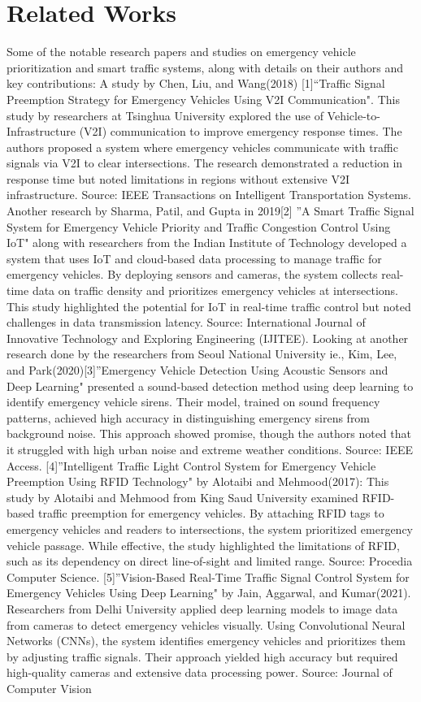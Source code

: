 \documentclass[conference]{IEEEtran}
\begin{document}
\section{Related Works}
Some of the notable research papers and studies on emergency vehicle prioritization and smart traffic systems, along with details on their authors and key contributions: 
A study by Chen, Liu, and Wang(2018) [1]“Traffic Signal Preemption Strategy for Emergency Vehicles Using V2I Communication". This study by researchers at Tsinghua University explored the use of Vehicle-to-Infrastructure (V2I) communication to improve emergency response times. The authors proposed a system where emergency vehicles communicate with traffic signals via V2I to clear intersections. The research demonstrated a reduction in response time but noted limitations in regions without extensive V2I infrastructure. Source: IEEE Transactions on Intelligent Transportation Systems. Another research by Sharma, Patil, and Gupta in 2019[2] ”A Smart Traffic Signal System for Emergency Vehicle Priority and Traffic Congestion Control Using IoT" along with researchers from the Indian Institute of Technology developed a system that uses IoT and cloud-based data processing to manage traffic for emergency vehicles. By deploying sensors and cameras, the system collects real-time data on traffic density and prioritizes emergency vehicles at intersections. This study highlighted the potential for IoT in real-time traffic control but noted challenges in data transmission latency. Source: International Journal of Innovative Technology and Exploring Engineering (IJITEE). Looking at another research done by the researchers from Seoul National University ie., Kim, Lee, and Park(2020)[3]”Emergency Vehicle Detection Using Acoustic Sensors and Deep Learning" presented a sound-based detection method using deep learning to identify emergency vehicle sirens. Their model, trained on sound frequency patterns, achieved high accuracy in distinguishing emergency sirens from background noise. This approach showed promise, though the authors noted that it struggled with high urban noise and extreme weather conditions. Source: IEEE Access. [4]”Intelligent Traffic Light Control System for Emergency Vehicle Preemption Using RFID Technology" by Alotaibi and Mehmood(2017): This study by Alotaibi and Mehmood from King Saud University examined RFID-based traffic preemption for emergency vehicles. By attaching RFID tags to emergency vehicles and readers to intersections, the system prioritized emergency vehicle passage. While effective, the study highlighted the limitations of RFID, such as its dependency on direct line-of-sight and limited range. Source: Procedia Computer Science. [5]”Vision-Based Real-Time Traffic Signal Control System for Emergency Vehicles Using Deep Learning" by Jain, Aggarwal, and Kumar(2021). Researchers from Delhi University applied deep learning models to image data from cameras to detect emergency vehicles visually. Using Convolutional Neural Networks (CNNs), the system identifies emergency vehicles and prioritizes them by adjusting traffic signals. Their approach yielded high accuracy but required high-quality cameras and extensive data processing power. Source: Journal of Computer Vision 
\end{document}
